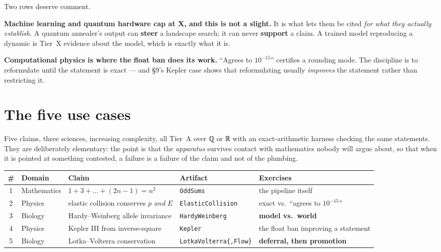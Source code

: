 \documentclass[11pt,a4paper]{article}
\begin{document}
Two rows deserve comment.

\textbf{Machine learning and quantum hardware cap at \textsf{X}, and this is not a slight.} It is
what lets them be cited \emph{for what they actually establish}. A quantum annealer's output can
\textbf{steer} a landscape search; it can never \textbf{support} a claim. A trained model
reproducing a dynamic is Tier~X evidence about the model, which is exactly what it is.

\textbf{Computational physics is where the float ban does its work.} ``Agrees to $10^{-15}$''
certifies a rounding mode. The discipline is to reformulate until the statement is exact — and
§9's Kepler case shows that reformulating usually \emph{improves} the statement rather than
restricting it.

\section{The five use cases}

Five claims, three sciences, increasing complexity, all Tier~A over ℚ or ℝ with an
exact-arithmetic harness checking the same statements. They are deliberately elementary: the
point is that the \emph{apparatus} survives contact with mathematics nobody will argue about, so
that when it is pointed at something contested, a failure is a failure of the claim and not of
the plumbing.

\begin{center}\small
\begin{tabular}{@{}clllp{4.3cm}@{}}
\toprule
\# & Domain & Claim & Artifact & Exercises \\
\midrule
1 & Mathematics & $1+3+\dots+(2n-1) = n^2$ & \texttt{OddSums} & the pipeline itself \\
2 & Physics & elastic collision conserves $p$ \emph{and} $E$ & \texttt{ElasticCollision} & exact vs.\ ``agrees to $10^{-15}$'' \\
3 & Biology & Hardy–Weinberg allele invariance & \texttt{HardyWeinberg} & \textbf{model vs.\ world} \\
4 & Physics & Kepler III from inverse-square & \texttt{Kepler} & the float ban improving a statement \\
5 & Biology & Lotka–Volterra conservation & \texttt{LotkaVolterra\{,Flow\}} & \textbf{deferral, then promotion} \\
\bottomrule
\end{tabular}
\end{center}
\end{document}
